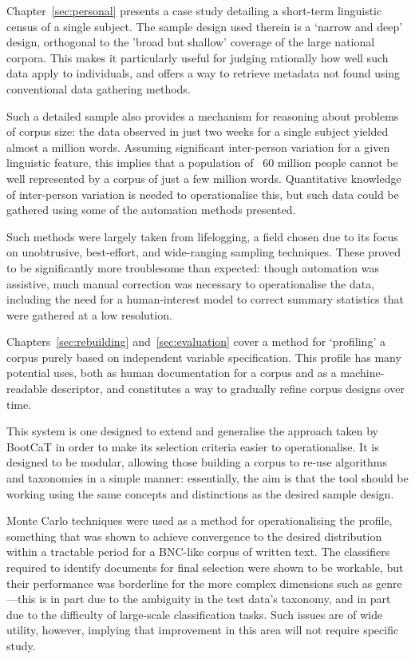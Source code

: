 Chapter~\ref{sec:personal} presents a case study detailing a short-term linguistic census of a single subject.  The sample design used therein is a `narrow and deep' design, orthogonal to the 'broad but shallow' coverage of the large national corpora.  This makes it particularly useful for judging rationally how well such data apply to individuals, and offers a way to retrieve metadata not found using conventional data gathering methods.

Such a detailed sample also provides a mechanism for reasoning about problems of corpus size: the data observed in just two weeks for a single subject yielded almost a million words.  Assuming significant inter-person variation for a given linguistic feature, this implies that a population of ~60 million people cannot be well represented by a corpus of just a few million words.  Quantitative knowledge of inter-person variation is needed to operationalise this, but such data could be gathered using some of the automation methods presented.

Such methods were largely taken from lifelogging, a field chosen due to its focus on unobtrusive, best-effort, and wide-ranging sampling techniques.  These proved to be significantly more troublesome than expected: though automation was assistive, much manual correction was necessary to operationalise the data, including the need for a human-interest model to correct summary statistics that were gathered at a low resolution.


Chapters~\ref{sec:rebuilding} and~\ref{sec:evaluation} cover a method for `profiling' a corpus purely based on independent variable specification.  This profile has many potential uses, both as human documentation for a corpus and as a machine-readable descriptor, and constitutes a way to gradually refine corpus designs over time.

This system is one designed to extend and generalise the approach taken by BootCaT in order to make its selection criteria easier to operationalise.  It is designed to be modular, allowing those building a corpus to re-use algorithms and taxonomies in a simple manner: essentially, the aim is that the tool should be working using the same concepts and distinctions as the desired sample design.

Monte Carlo techniques were used as a method for operationalising the profile, something that was shown to achieve convergence to the desired distribution within a tractable period for a BNC-like corpus of written text.  The classifiers required to identify documents for final selection were shown to be workable, but their performance was borderline for the more complex dimensions such as genre---this is in part due to the ambiguity in the test data's taxonomy, and in part due to the difficulty of large-scale classification tasks.  Such issues are of wide utility, however, implying that improvement in this area will not require specific study.

